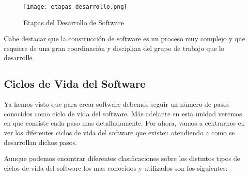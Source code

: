 \begin{figure}[h]
    \centering
    \texttt{[image: etapas-desarrollo.png]}
    \caption{Etapas del Desarrollo de Software}
\end{figure}

Cabe destacar que la construcción de software es un proceso muy complejo y que requiere de una gran coordinación y disciplina del grupo de trabajo que lo desarrolle.

\subsection{Ciclos de Vida del Software}
Ya hemos visto que para crear software debemos seguir un número de pasos conocidos como ciclo de vida del software. Más adelante en esta unidad veremos en que consiste cada paso mas detalladamente. Por ahora, vamos a centrarnos en ver los diferentes ciclos de vida del software que existen atendiendo a como se desarrollan dichos pasos.

Aunque podemos encontrar diferentes clasificaciones sobre los distintos tipos de ciclos de vida del software los mas conocidos y utilizados son los siguientes:

